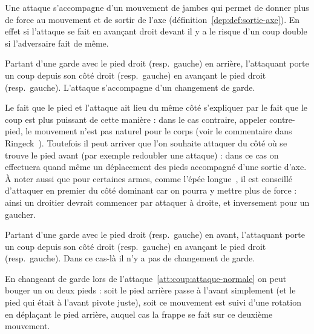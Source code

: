 
Une attaque s'accompagne d'un mouvement de jambes qui permet de donner plus de force au mouvement et de sortir de l'axe (définition~\ref{dep:def:sortie-axe}).
En effet si l'attaque se fait en avançant droit devant il y a le risque d'un coup double si l'adversaire fait de même.


\begin{coup}
\label{att:coup:attaque-normale}

Partant d'une garde avec le pied droit (resp.\ gauche) en arrière, l'attaquant porte un coup depuis son côté droit (resp.\ gauche) en avançant le pied droit (resp.\ gauche).
L'attaque s'accompagne d'un changement de garde.
\end{coup}

Le fait que le pied et l'attaque ait lieu du même côté s'expliquer par le fait que le coup est plus puissant de cette manière : dans le cas contraire, appeler contre-pied, le mouvement n'est pas naturel pour le corps (voir le commentaire dans Ringeck~\cite[p.~7]{Ringeck:Farrell:2014:CodexRingeck}).
Toutefois il peut arriver que l'on souhaite attaquer du côté où se trouve le pied avant (par exemple redoubler une attaque) : dans ce cas on effectuera quand même un déplacement des pieds accompagné d'une sortie d'axe.
À noter aussi que pour certaines armes, comme l'épée longue~\cite[p.~10]{Ringeck:Farrell:2014:CodexRingeck}, il est conseillé d'attaquer en premier du côté dominant car on pourra y mettre plus de force : ainsi un droitier devrait commencer par attaquer à droite, et inversement pour un gaucher.


\begin{coup}
\label{att:coup:attaque-même-côté}

Partant d'une garde avec le pied droit (resp.\ gauche) en avant, l'attaquant porte un coup depuis son côté droit (resp.\ gauche) en avançant le pied droit (resp.\ gauche).
Dans ce cas-là il n'y a pas de changement de garde.
\end{coup}


En changeant de garde lors de l'attaque~\ref{att:coup:attaque-normale} on peut bouger un ou deux pieds : soit le pied arrière passe à l'avant simplement (et le pied qui était à l'avant pivote juste), soit ce mouvement est suivi d'une rotation en déplaçant le pied arrière, auquel cas la frappe se fait sur ce deuxième mouvement.

